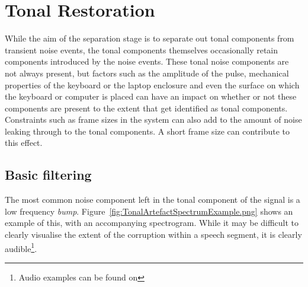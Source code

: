 \section{Tonal Restoration}\label{sec:TonalFiltering}
While the aim of the \DIFdelbegin {}\DIFdelend \DIFaddbegin {}\DIFaddend separation stage is to separate out tonal components from transient noise events, the tonal components themselves occasionally retain components introduced by the noise events. These tonal noise components are not always present, but factors such as the amplitude of the pulse, mechanical properties of the keyboard or the laptop enclosure and even the surface on which the keyboard or computer is placed can have an impact on whether or not these components are present to the extent that \DIFaddbegin {}\DIFaddend get identified as tonal components. Constraints such as frame sizes in the system can also add to the amount of noise leaking through to the tonal components. A short frame size can contribute to this effect.

\subsection{Basic filtering}\label{sec:TonalFiltering}
The most common noise component left in the tonal component of the signal is a low frequency \emph{bump}. Figure~\ref{fig:TonalArtefactSpectrumExample.png} shows an example of this, with an accompanying spectrogram. While it may be difficult to clearly visualise the extent of the corruption within a speech segment, it is \DIFdelbegin {}\DIFdelend \DIFaddbegin {}\DIFaddend clearly audible\footnote{Audio examples can be found on \siteURL}.

